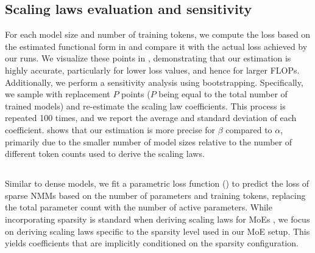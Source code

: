 \subsection{Scaling laws evaluation and sensitivity}

For each model size and number of training tokens, we compute the loss based on the estimated functional form in  and compare it with the actual loss achieved by our runs. We visualize these points in , demonstrating that our estimation is highly accurate, particularly for lower loss values, and hence for larger FLOPs. Additionally, we perform a sensitivity analysis using bootstrapping. Specifically, we sample with replacement \( P \) points (\( P \) being equal to the total number of trained models) and re-estimate the scaling law coefficients. This process is repeated 100 times, and we report the average and standard deviation of each coefficient.  shows that our estimation is more precise for \(\beta\) compared to \(\alpha\), primarily due to the smaller number of model sizes relative to the number of different token counts used to derive the scaling laws.  





\begin{table}[htb]
    \centering
    \setlength{\tabcolsep}{16pt} %
    \renewcommand{\arraystretch}{1} %
    \caption{\textbf{Scaling laws sensitivity.} We report the mean and standard deviation after bootstrapping with 100 iterations.}
    \label{tab:scaling_laws_sensitivity}
\end{table}


\subsection{}
\label{app:scaling_laws_moes}

Similar to dense models, we fit a parametric loss function () to predict the loss of sparse NMMs based on the number of parameters and training tokens, replacing the total parameter count with the number of active parameters. While incorporating sparsity is standard when deriving scaling laws for MoEs \citep{wangscalingmoe,krajewski2024scalingmoe,abnar2025parameters}, we focus on deriving scaling laws specific to the sparsity level used in our MoE setup. This yields coefficients that are implicitly conditioned on the sparsity configuration. 

